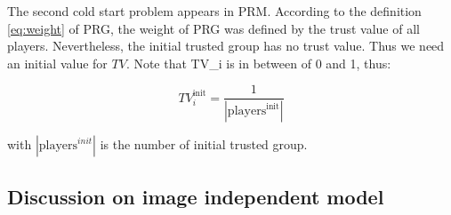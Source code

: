 The second cold start problem appears in PRM. According to the definition \ref{eq:weight} of PRG, the weight
of PRG was defined by the trust value of all players. Nevertheless, the initial trusted group has
no trust value. Thus we need an initial value for $TV$. Note that TV\_i is in between of 0 and 1, thus:

\[
TV_{i}^{\text{init}} = \frac{1}{|\text{players}^{\text{init}}|}
\]

with $|\text{players}^{init}|$ is the number of initial trusted group. 

\subsection{Discussion on image independent model}
